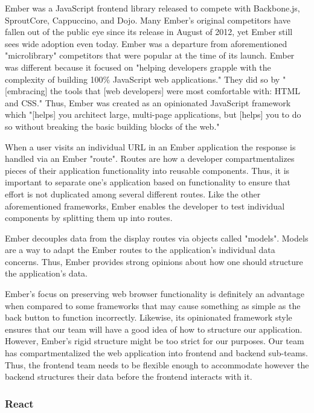 \documentclass[12pt]{report}
\begin{document}
Ember was a JavaScript frontend library released to compete with Backbone.js, SproutCore, Cappuccino, and Dojo.\cite{emberrelease} Many Ember's original competitors have fallen out of the public eye since its release in August of 2012, yet Ember still sees wide adoption even today. Ember was a departure from aforementioned "microlibrary" competitors that were popular at the time of its launch. Ember was different because it focused on "helping developers grapple with the complexity of building 100\% JavaScript web applications."\cite{emberrelease} They did so by "[embracing] the tools that [web developers] were most comfortable with: HTML and CSS."\cite{emberrelease} Thus, Ember was created as an opinionated JavaScript framework which "[helps] you architect large, multi-page applications, but [helps] you to do so without breaking the basic building blocks of the web."\cite{emberrelease}

When a user visits an individual URL in an Ember application the response is handled via an Ember "route".\cite{emberrouting} Routes are how a developer compartmentalizes pieces of their application functionality into reusable components. Thus, it is important to separate one's application based on functionality to ensure that effort is not duplicated among several different routes. Like the other aforementioned frameworks, Ember enables the developer to test individual components by splitting them up into routes.

Ember decouples data from the display routes via objects called "models".\cite{embermodel} Models are a way to adapt the Ember routes to the application's individual data concerns. Thus, Ember provides strong opinions about how one should structure the application's data.

Ember's focus on preserving web browser functionality is definitely an advantage when compared to some frameworks that may cause something as simple as the back button to function incorrectly. Likewise, its opinionated framework style ensures that our team will have a good idea of how to structure our application. However, Ember's rigid structure might be too strict for our purposes. Our team has compartmentalized the web application into frontend and backend sub-teams. Thus, the frontend team needs to be flexible enough to accommodate however the backend structures their data before the frontend interacts with it.

\subsubsection*{React}
\end{document}
